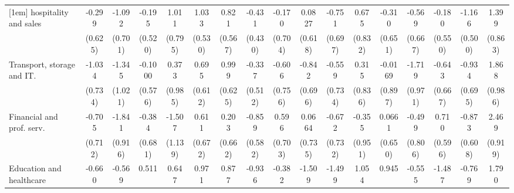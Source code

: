 {\begin{tabular}{l*{16}{c}}
[1em]
hospitality and sales&      -0.299         &      -1.092         &      -0.195         &       1.011         &       1.033         &       0.821         &      -0.431         &      -0.170         &      0.0827         &      -0.751         &       0.675         &      -0.310         &      -0.569         &      -0.180         &      -1.166\sym{*}  &       1.399         \\
                    &     (0.625)         &     (0.701)         &     (0.520)         &     (0.795)         &     (0.530)         &     (0.567)         &     (0.430)         &     (0.704)         &     (0.618)         &     (0.697)         &     (0.832)         &     (0.651)         &     (0.667)         &     (0.550)         &     (0.500)         &     (0.863)         \\
[1em]
Transport, storage and IT.&      -1.034         &      -1.345         &     -0.1000         &       0.373         &       0.695         &       0.999         &      -0.337         &      -0.606         &      -0.842         &      -0.559         &       0.315         &     -0.0169         &      -1.719         &      -0.643         &      -0.934         &       1.868         \\
                    &     (0.734)         &     (1.021)         &     (0.576)         &     (0.985)         &     (0.612)         &     (0.625)         &     (0.512)         &     (0.756)         &     (0.696)         &     (0.734)         &     (0.836)         &     (0.897)         &     (0.971)         &     (0.667)         &     (0.695)         &     (0.986)         \\
[1em]
Financial and prof. serv.&      -0.705         &      -1.841\sym{*}  &      -0.384         &      -1.507         &       0.611         &       0.203         &      -0.859         &       0.596         &      0.0664         &      -0.672         &      -0.355         &      0.0661         &      -0.499         &       0.710         &      -0.873         &       2.469\sym{**} \\
                    &     (0.712)         &     (0.916)         &     (0.681)         &     (1.139)         &     (0.672)         &     (0.662)         &     (0.582)         &     (0.703)         &     (0.735)         &     (0.732)         &     (0.951)         &     (0.650)         &     (0.806)         &     (0.596)         &     (0.608)         &     (0.919)         \\
[1em]
Education and healthcare&      -0.660         &      -0.569         &       0.511         &       0.647         &       0.971         &       0.877         &      -0.936         &      -0.382         &      -1.509         &      -1.499         &       1.054         &       0.945         &      -0.555         &      -1.487         &      -0.769         &       1.790         \\

\end{tabular}}
